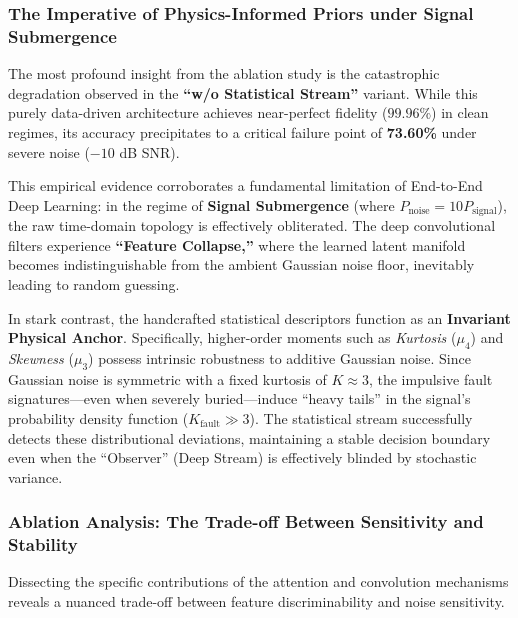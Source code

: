 \documentclass[5p,times,twocolumn]{elsarticle}
\begin{document}
\subsubsection{The Imperative of Physics-Informed Priors under Signal Submergence}
The most profound insight from the ablation study is the catastrophic degradation observed in the \textbf{``w/o Statistical Stream''} variant. While this purely data-driven architecture achieves near-perfect fidelity ($99.96\%$) in clean regimes, its accuracy precipitates to a critical failure point of \textbf{73.60\%} under severe noise ($-10$ dB SNR).

This empirical evidence corroborates a fundamental limitation of End-to-End Deep Learning: in the regime of \textbf{Signal Submergence} (where $P_{\text{noise}} = 10 P_{\text{signal}}$), the raw time-domain topology is effectively obliterated. The deep convolutional filters experience \textbf{``Feature Collapse,''} where the learned latent manifold becomes indistinguishable from the ambient Gaussian noise floor, inevitably leading to random guessing.



In stark contrast, the handcrafted statistical descriptors function as an \textbf{Invariant Physical Anchor}. Specifically, higher-order moments such as \textit{Kurtosis} ($\mu_4$) and \textit{Skewness} ($\mu_3$) possess intrinsic robustness to additive Gaussian noise. Since Gaussian noise is symmetric with a fixed kurtosis of $K \approx 3$, the impulsive fault signatures---even when severely buried---induce ``heavy tails'' in the signal's probability density function ($K_{\text{fault}} \gg 3$). The statistical stream successfully detects these distributional deviations, maintaining a stable decision boundary even when the ``Observer'' (Deep Stream) is effectively blinded by stochastic variance.

\subsubsection{Ablation Analysis: The Trade-off Between Sensitivity and Stability}
Dissecting the specific contributions of the attention and convolution mechanisms reveals a nuanced trade-off between feature discriminability and noise sensitivity.
\end{document}
